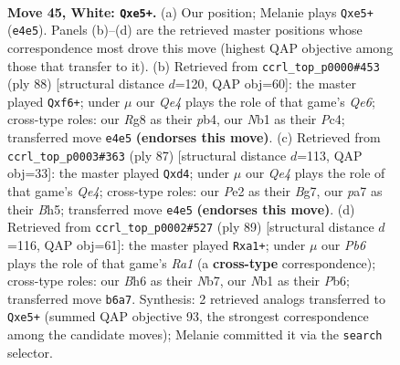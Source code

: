 \documentclass[11pt]{article}
\begin{document}
\clearpage

\begin{figure}[p]\centering
\begin{subfigure}{0.46\textwidth}\centering
\resizebox{\linewidth}{!}{%
\newchessgame
\chessboard[
  setfen={2b3R1/p2nk2p/1P3r1B/4qP2/1p1pQ3/8/p3P3/1N1K4 w - - 2 45},
  showmover=false,
  pgfstyle=straightmove, color=movearrow, markmove={e4-e5}
]}
\caption{}
\end{subfigure}\hfill
\begin{subfigure}{0.46\textwidth}\centering
\resizebox{\linewidth}{!}{%
\newchessgame
\chessboard[
  setfen={8/1R3pk1/p3Qq2/P1pP4/1pP2rP1/5P2/6K1/8 w - - 3 45},
  showmover=false,
  pgfstyle=straightmove, color=movearrow, markmove={e6-f6}
]}
\caption{}
\end{subfigure}
\\[4pt]
\begin{subfigure}{0.46\textwidth}\centering
\resizebox{\linewidth}{!}{%
\newchessgame
\chessboard[
  setfen={6k1/6b1/8/3pq1pb/1p1R1p1P/1P6/3B1P1N/Q5K1 b - - 0 44},
  showmover=false,
  pgfstyle=straightmove, color=movearrow, markmove={e5-d4}
]}
\caption{}
\end{subfigure}\hfill
\begin{subfigure}{0.46\textwidth}\centering
\resizebox{\linewidth}{!}{%
\newchessgame
\chessboard[
  setfen={r5k1/1n4p1/1p3qR1/3PN2Q/2P2P1P/3p4/7P/R6K b - - 0 45},
  showmover=false,
  pgfstyle=straightmove, color=movearrow, markmove={a8-a1}
]}
\caption{}
\end{subfigure}
\caption{\textbf{Move 45, White: \texttt{Qxe5+}.} (a) Our position; Melanie plays \texttt{Qxe5+} (\texttt{e4e5}). Panels (b)--(d) are the retrieved master positions whose correspondence most drove this move (highest QAP objective among those that transfer to it). (b) Retrieved from \texttt{ccrl\_top\_p0000\#453} (ply 88) [structural distance $d$=120, QAP obj=60]: the master played \texttt{Qxf6+}; under $\mu$ our \emph{Qe4} plays the role of that game's \emph{Qe6}; cross-type roles: our \emph{R}g8 as their \emph{p}b4, our \emph{N}b1 as their \emph{P}c4; transferred move \texttt{e4e5} \textbf{(endorses this move)}. (c) Retrieved from \texttt{ccrl\_top\_p0003\#363} (ply 87) [structural distance $d$=113, QAP obj=33]: the master played \texttt{Qxd4}; under $\mu$ our \emph{Qe4} plays the role of that game's \emph{Qe4}; cross-type roles: our \emph{P}e2 as their \emph{B}g7, our \emph{p}a7 as their \emph{B}h5; transferred move \texttt{e4e5} \textbf{(endorses this move)}. (d) Retrieved from \texttt{ccrl\_top\_p0002\#527} (ply 89) [structural distance $d$=116, QAP obj=61]: the master played \texttt{Rxa1+}; under $\mu$ our \emph{Pb6} plays the role of that game's \emph{Ra1} (a \textbf{cross-type} correspondence); cross-type roles: our \emph{B}h6 as their \emph{N}b7, our \emph{N}b1 as their \emph{P}b6; transferred move \texttt{b6a7}. Synthesis: 2 retrieved analogs transferred to \texttt{Qxe5+} (summed QAP objective 93, the strongest correspondence among the candidate moves); Melanie committed it via the \texttt{search} selector.}
\label{fig:thought-m88}
\end{figure}
\end{document}
